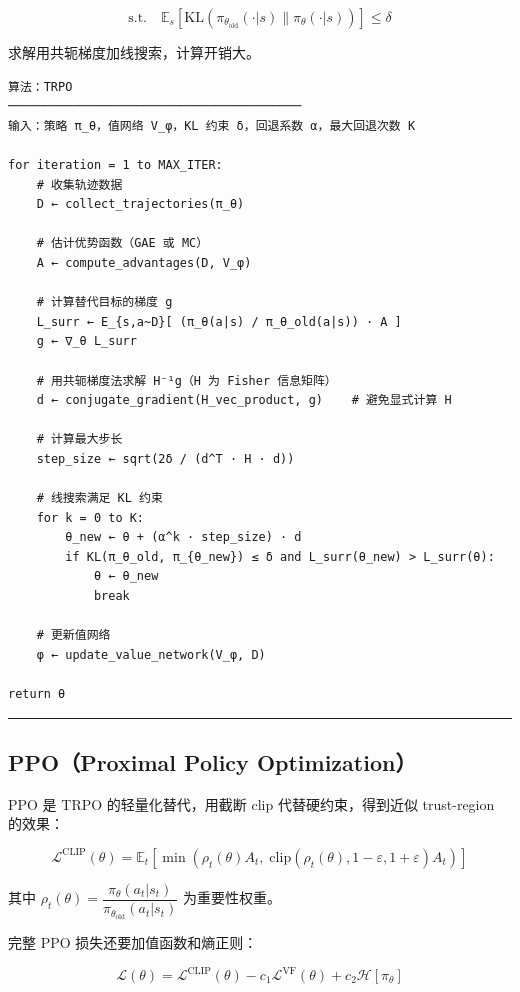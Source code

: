 \[
\text{s.t.} \quad \mathbb{E}_s\left[\mathrm{KL}(\pi_{\theta_\mathrm{old}}(\cdot|s) \| \pi_\theta(\cdot|s))\right] \leq \delta
\]

求解用共轭梯度加线搜索，计算开销大。

\begin{verbatim}
算法：TRPO
─────────────────────────────────────────
输入：策略 π_θ，值网络 V_φ，KL 约束 δ，回退系数 α，最大回退次数 K

for iteration = 1 to MAX_ITER:
    # 收集轨迹数据
    D ← collect_trajectories(π_θ)
    
    # 估计优势函数（GAE 或 MC）
    A ← compute_advantages(D, V_φ)
    
    # 计算替代目标的梯度 g
    L_surr ← E_{s,a~D}[ (π_θ(a|s) / π_θ_old(a|s)) · A ]
    g ← ∇_θ L_surr
    
    # 用共轭梯度法求解 H⁻¹g（H 为 Fisher 信息矩阵）
    d ← conjugate_gradient(H_vec_product, g)    # 避免显式计算 H
    
    # 计算最大步长
    step_size ← sqrt(2δ / (d^T · H · d))
    
    # 线搜索满足 KL 约束
    for k = 0 to K:
        θ_new ← θ + (α^k · step_size) · d
        if KL(π_θ_old, π_{θ_new}) ≤ δ and L_surr(θ_new) > L_surr(θ):
            θ ← θ_new
            break
    
    # 更新值网络
    φ ← update_value_network(V_φ, D)

return θ
\end{verbatim}

\hrule

\subsection{PPO（Proximal Policy Optimization）}

PPO 是 TRPO 的轻量化替代，用截断 clip 代替硬约束，得到近似 trust-region 的效果：

\[
\mathcal{L}^\mathrm{CLIP}(\theta) = \mathbb{E}_t\left[\min\left(\rho_t(\theta) A_t,\; \mathrm{clip}(\rho_t(\theta), 1-\varepsilon, 1+\varepsilon) A_t\right)\right]
\]

其中 \(\rho_t(\theta) = \dfrac{\pi_\theta(a_t|s_t)}{\pi_{\theta_\mathrm{old}}(a_t|s_t)}\) 为重要性权重。

完整 PPO 损失还要加值函数和熵正则：

\[
\mathcal{L}(\theta) = \mathcal{L}^\mathrm{CLIP}(\theta) - c_1 \mathcal{L}^\mathrm{VF}(\theta) + c_2 \mathcal{H}[\pi_\theta]
\]

